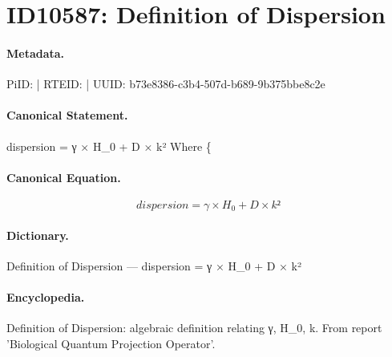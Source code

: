 \section*{ID10587: Definition of Dispersion}
\paragraph{Metadata.}
PiID:  | RTEID:  | UUID: b73e8386-c3b4-507d-b689-9b375bbe8c2e

\paragraph{Canonical Statement.}
dispersion = γ × H\_0 + D × k² Where \{

\paragraph{Canonical Equation.}
\[
dispersion = γ × H_0 + D × k²
\]

\paragraph{Dictionary.}
Definition of Dispersion — dispersion = γ × H\_0 + D × k²

\paragraph{Encyclopedia.}
Definition of Dispersion: algebraic definition relating γ, H\_0, k. From report 'Biological Quantum Projection Operator'.
